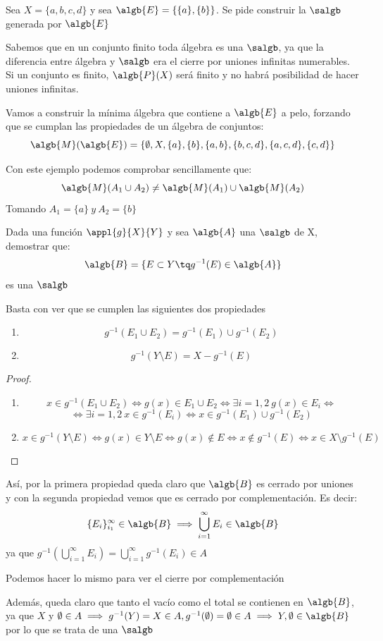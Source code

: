 \begin{problem}[2]
Sea $X=\{a,b,c,d\}$ y sea $\algb{E}=\{\{a\},\{b\}\}$. Se pide construir la $\salgb$ generada por $\algb{E}$

\solution
Sabemos que en un conjunto finito toda álgebra es una $\salgb$, ya que la diferencia entre álgebra y $\salgb$ era el cierre por uniones infinitas numerables. Si un conjunto es finito, $\algb{P}(X)$ será finito y no habrá posibilidad de hacer uniones infinitas.

Vamos a construir la mínima álgebra que contiene a $\algb{E}$ a pelo, forzando que se cumplan las propiedades de un álgebra de conjuntos:
\[\algb{M}(\algb{E})=\{\emptyset, X, \{a\}, \{b\}, \{a,b\}, \{b,c,d\}, \{a,c,d\}, \{c,d\}\}\]

Con este ejemplo podemos comprobar sencillamente que:
\[\algb{M}(A_1 \cup A_2) \neq \algb{M}(A_1) \cup \algb{M}(A_2)\]
Tomando $A_1=\{a\} \ y \ A_2 = \{b\}$

\end{problem}

\begin{problem}[4]
Dada una función $\appl{g}{X}{Y}$ y sea $\algb{A}$ una $\salgb$ de X, demostrar que:
\[\algb{B}=\{E\subset Y \tq g^{-1}(E)\in \algb{A}\}\]
es una $\salgb$

\solution
Basta con ver que se cumplen las siguientes dos propiedades
\begin{enumerate}
\item 
\[g^{-1}(E_1 \cup E_2)=g^{-1}(E_1) \cup g^{-1}(E_2)\]
\item
\[g^{-1}(Y \setminus E) = X - g^{-1}(E)\]
\end{enumerate}


\begin{proof}
\begin{enumerate}
\item
\[x\in g^{-1}(E_1 \cup E_2) \iff g(x) \in E_1 \cup E_2 \iff  \exists i=1,2 \ g(x) \in E_i \iff \]
\[\iff \exists i=1,2 \ x\in g^{-1}(E_i) \iff x\in g^{-1}(E_1) \cup g^{-1}(E_2) \]
\item
\[x\in g^{-1}(Y \setminus E) \iff g(x) \in Y \setminus E \iff g(x) \notin E \iff x \notin g^{-1}(E) \iff x \in X\setminus g^{-1}(E)\]
\end{enumerate}

\end{proof}
Así, por la primera propiedad queda claro que $\algb{B}$ es cerrado por uniones y con la segunda propiedad vemos que es cerrado por complementación. Es decir:
\[\{E_i\}_{i_1}^{\infty} \in \algb{B} \implies \bigcup_{i=1}^{\infty} E_i \in \algb{B}\]
ya que $g^{-1}(\bigcup_{i=1}^{\infty} E_i) = \bigcup_{i=1}^{\infty} g^{-1}(E_i) \in A$

Podemos hacer lo mismo para ver el cierre por complementación

Además, queda claro que tanto el vacío como el total se contienen en $\algb{B}$, ya que $X$ y $\emptyset \in A \implies g^{-1}(Y)=X \in A, g^{-1}(\emptyset)=\emptyset \in A \implies Y, \emptyset \in \algb{B}$ por lo que se trata de una $\salgb$
\end{problem}


